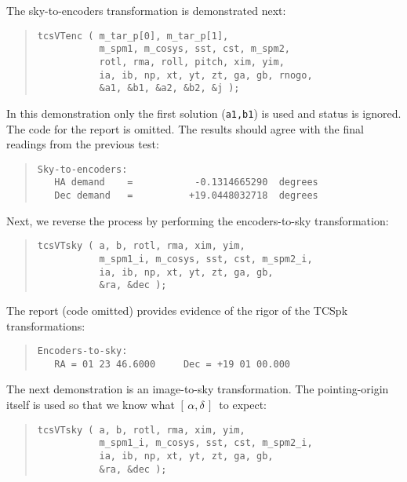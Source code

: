 \documentclass[12pt,fleqn,twoside]{article}
\renewcommand{\_}{{\tt\char'137}}     %
\newcommand{\radec}     {$[\,\alpha,\delta\,]$}
\begin{document}
The sky-to-encoders transformation is demonstrated next:
\begin{quote}
\begin{small}
\begin{verbatim}
tcsVTenc ( m_tar_p[0], m_tar_p[1],
           m_spm1, m_cosys, sst, cst, m_spm2,
           rotl, rma, roll, pitch, xim, yim,
           ia, ib, np, xt, yt, zt, ga, gb, rnogo,
           &a1, &b1, &a2, &b2, &j );
\end{verbatim}\end{small}
\end{quote}
In this demonstration only the first solution ({\tt a1,b1})
is used and status is ignored.  The code for the report is omitted.
The results should agree with the final readings
from the previous test:
\begin{quote}
\begin{small}
\begin{verbatim}
Sky-to-encoders:
   HA demand    =           -0.1314665290  degrees
   Dec demand   =          +19.0448032718  degrees
\end{verbatim}\end{small}
\end{quote}
Next, we reverse the process by performing the
encoders-to-sky transformation:
\begin{quote}
\begin{small}
\begin{verbatim}
tcsVTsky ( a, b, rotl, rma, xim, yim,
           m_spm1_i, m_cosys, sst, cst, m_spm2_i,
           ia, ib, np, xt, yt, zt, ga, gb,
           &ra, &dec );
\end{verbatim}\end{small}
\end{quote}
The report (code omitted) provides
evidence of the rigor of the TCSpk transformations:
\begin{quote}
\begin{small}
\begin{verbatim}
Encoders-to-sky:
   RA = 01 23 46.6000     Dec = +19 01 00.000
\end{verbatim}\end{small}
\end{quote}
The next demonstration is an
image-to-sky transformation.  The pointing-origin itself
is used so that we know what \radec\ to expect:
\begin{quote}
\begin{small}
\begin{verbatim}
tcsVTsky ( a, b, rotl, rma, xim, yim,
           m_spm1_i, m_cosys, sst, cst, m_spm2_i,
           ia, ib, np, xt, yt, zt, ga, gb,
           &ra, &dec );
\end{verbatim}\end{small}
\end{quote}
\end{document}
